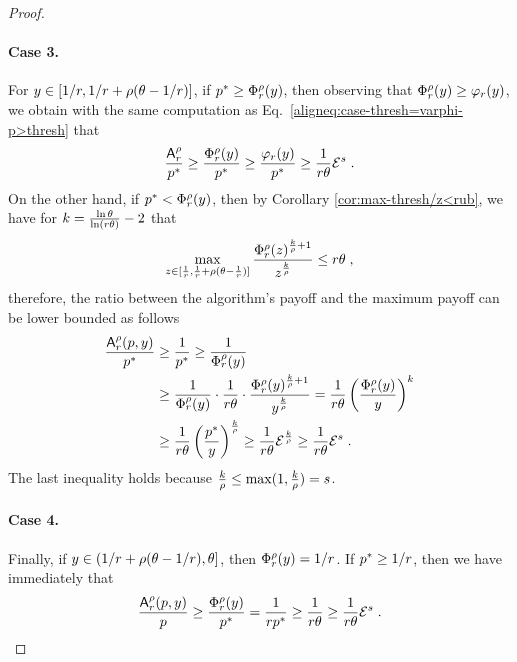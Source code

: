 \begin{proof}
\paragraph{Case 3.} For $y \in [1/r, 1/r + \rho(\theta-1/r)]$, if $p^* \geq \Phi^\rho_r(y)$, then observing that $\Phi^\rho_r(y) \geq \varphi_r(y)$, we obtain with the same computation as Eq.~\eqref{aligneq:case-thresh=varphi-p>thresh} that
\[
\frac{\mbox{\textup{\textsf{A}}}^\rho_r}{p^*} 
\geq \frac{\Phi^\rho_r(y)}{p^*}
\geq \frac{\varphi_r(y)}{p^*}
\geq \frac{1}{r \theta} \mathcal{E}^s\;.
\]
On the other hand, if $p^* < \Phi^\rho_r(y)$, then by Corollary \ref{cor:max-thresh/z<rub}, we have for $k = \frac{\ln\theta}{\ln(r \theta)}-2$ that 
\[
\max_{z \in [\frac{1}{r}, \frac{1}{r}+\rho(\theta-\frac{1}{r})]} \frac{\Phi^\rho_r(z)^{\frac{k}{\rho}+1}}{z^{\frac{k}{\rho}}} \leq r \theta\;,
\]
therefore, the ratio between the algorithm's payoff and the maximum payoff can be lower bounded as follows
\begin{align*}
\frac{\mbox{\textup{\textsf{A}}}^\rho_r(p,y)}{p^*}
&\geq \frac{1}{p^*}
\geq \frac{1}{\Phi^\rho_r(y)}\\
&\geq \frac{1}{\Phi^\rho_r(y)} \cdot \frac{1}{r \theta} \cdot \frac{\Phi^\rho_r(y)^{\frac{k}{\rho}+1}}{y^{\frac{k}{\rho}}}
= \frac{1}{r \theta} \left( \frac{\Phi^\rho_r(y)}{y} \right)^k\\
&\geq \frac{1}{r \theta} \left( \frac{p^*}{y}\right)^{\frac{k}{\rho}}
\geq \frac{1}{r \theta} \mathcal{E}^{\frac{k}{\rho}}
\geq \frac{1}{r \theta} \mathcal{E}^s\;.
\end{align*}
The last inequality holds because $\frac{k}{\rho} \leq \max(1,{\frac{k}{\rho}}) = s$.


\paragraph{Case 4.} Finally, if $y \in (1/r + \rho(\theta - 1/r), \theta]$, then $\Phi^\rho_r(y) = 1/r$. If $p^* \geq 1/r$, then we have immediately that
\[
\frac{\mbox{\textup{\textsf{A}}}^\rho_r(p,y)}{p}
\geq \frac{\Phi^\rho_r(y)}{p^*}
= \frac{1}{r p^*}
\geq \frac{1}{r \theta}
\geq \frac{1}{r \theta} \mathcal{E}^s\;.
\]


\end{proof}
